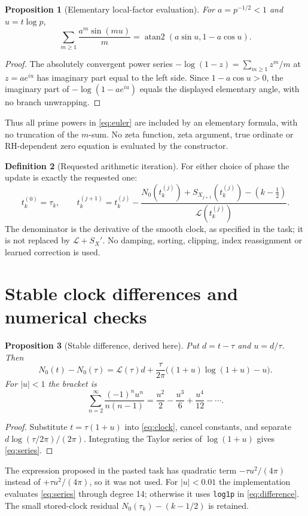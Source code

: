 \documentclass[11pt]{amsart}
\numberwithin{equation}{section}
\newtheorem{proposition}{Proposition}[section]
\theoremstyle{definition}\newtheorem{definition}[proposition]{Definition}
\theoremstyle{remark}\newtheorem{remark}[proposition]{Remark}
\begin{document}
\begin{proposition}[Elementary local-factor evaluation]\label{prop:factor}
For $a=p^{-1/2}<1$ and $u=t\log p$,
\begin{equation}
\sum_{m\ge1}\frac{a^m\sin(mu)}m
=\operatorname{atan2}(a\sin u,1-a\cos u).
\label{eq:factor}
\end{equation}
\end{proposition}
\begin{proof}
The absolutely convergent power series $-\log(1-z)=\sum_{m\ge1}z^m/m$
at $z=ae^{iu}$ has imaginary part equal to the left side.
Since $1-a\cos u>0$, the imaginary part of $-\log(1-ae^{iu})$
equals the displayed elementary angle, with no branch unwrapping.
\end{proof}
Thus all prime powers in \eqref{eq:euler} are included by an elementary
formula, with no truncation of the $m$-sum. No zeta function, zeta argument,
true ordinate or RH-dependent zero equation is evaluated by the constructor.

\begin{definition}[Requested arithmetic iteration]\label{def:iteration}
For either choice of phase the update is exactly the requested one:
\begin{equation}
t_k^{(0)}=\tau_k,\qquad
t_k^{(j+1)}=t_k^{(j)}-
\frac{N_0(t_k^{(j)})+S_{X_{j+1}}(t_k^{(j)})-(k-\tfrac12)}
{\mathcal L(t_k^{(j)})}.
\label{eq:iteration}
\end{equation}
The denominator is the derivative of the smooth clock, as specified in
the task; it is not replaced by $\mathcal L+S_X'$.
No damping, sorting, clipping, index reassignment or learned correction is used.
\end{definition}

\section{Stable clock differences and numerical checks}\label{sec:numerics}
\begin{proposition}[Stable difference, derived here]\label{prop:difference}
Put $d=t-\tau$ and $u=d/\tau$. Then
\begin{equation}
N_0(t)-N_0(\tau)=\mathcal L(\tau)d+
\frac{\tau}{2\pi}\bigl((1+u)\log(1+u)-u\bigr).
\label{eq:difference}
\end{equation}
For $|u|<1$ the bracket is
\begin{equation}
\sum_{n=2}^{\infty}\frac{(-1)^n u^n}{n(n-1)}
=\frac{u^2}{2}-\frac{u^3}{6}+\frac{u^4}{12}-\cdots.
\label{eq:series}
\end{equation}
\end{proposition}
\begin{proof}
Substitute $t=\tau(1+u)$ into \eqref{eq:clock}, cancel constants,
and separate $d\log(\tau/2\pi)/(2\pi)$. Integrating the Taylor series
of $\log(1+u)$ gives \eqref{eq:series}.
\end{proof}
The expression proposed in the pasted task has quadratic term
$-\tau u^2/(4\pi)$ instead of $+\tau u^2/(4\pi)$, so it was not used.
For $|u|<0.01$ the implementation evaluates \eqref{eq:series} through degree 14;
otherwise it uses \texttt{log1p} in \eqref{eq:difference}.
The small stored-clock residual $N_0(\tau_k)-(k-1/2)$ is retained.
\end{document}
